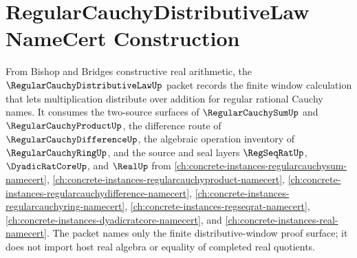 \chapter{RegularCauchyDistributiveLaw NameCert Construction}
\label{ch:concrete-instances-regular-cauchy-distributive-law-namecert}

From Bishop and Bridges constructive real arithmetic, the $\RegularCauchyDistributiveLawUp$ packet records the finite window calculation that lets multiplication distribute over addition for regular rational Cauchy names. It consumes the two-source surfaces of $\RegularCauchySumUp$ and $\RegularCauchyProductUp$, the difference route of $\RegularCauchyDifferenceUp$, the algebraic operation inventory of $\RegularCauchyRingUp$, and the source and seal layers $\RegSeqRatUp$, $\DyadicRatCoreUp$, and $\RealUp$ from \autoref{ch:concrete-instances-regularcauchysum-namecert}, \autoref{ch:concrete-instances-regularcauchyproduct-namecert}, \autoref{ch:concrete-instances-regularcauchydifference-namecert}, \autoref{ch:concrete-instances-regularcauchyring-namecert}, \autoref{ch:concrete-instances-regseqrat-namecert}, \autoref{ch:concrete-instances-dyadicratcore-namecert}, and \autoref{ch:concrete-instances-real-namecert}. The packet names only the finite distributive-window proof surface; it does not import host real algebra or equality of completed real quotients.

